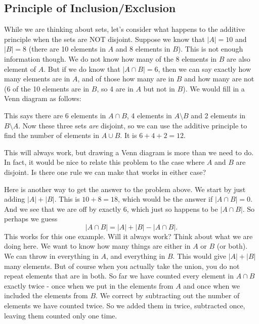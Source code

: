 \documentclass[12pt]{article}
\begin{document}
\subsection{Principle of Inclusion/Exclusion}\label{sec-PIE}

While we are thinking about sets, let's consider what happens to the additive principle when the sets are NOT disjoint. Suppose we know that $|A| = 10$ and $|B| = 8$ (there are 10 elements in $A$ and 8 elements in $B$).  This is not enough information though.  We do not know how many of the 8 elements in $B$ are also element of $A$.  But if we do know that $|A \cap B| = 6$, then we can say exactly how many elements are in $A$, and of those how many are in $B$ and how many are not (6 of the 10 elements are in $B$, so 4 are in $A$ but not in $B$).  We would fill in a Venn diagram as follows:

\begin{center}



\end{center}

This says there are 6 elements in $A \cap B$, 4 elements in $A \setminus B$ and 2 elements in $B \setminus A$.  Now these three sets {\em are} disjoint, so we can use the additive principle to find the number of elements in $A \cup B$.  It is $6 + 4 + 2 = 12$.  

This will always work, but drawing a Venn diagram is more than we need to do.  In fact, it would be nice to relate this problem to the case where $A$ and $B$ are disjoint.  Is there one rule we can make that works in either case?

Here is another way to get the answer to the problem above.  We start by just adding $|A| + |B|$.  This is $10 + 8 = 18$, which would be the answer if $|A \cap B| = 0$.  And we see that we are off by exactly 6, which just so happens to be $|A \cap B|$.  So perhaps we guess
\[|A \cap B| = |A| + |B| - |A \cap B|.\]
This works for this one example.  Will it always work?  Think about what we are doing here.  We want to know how many things are either in $A$ or $B$ (or both).  We can throw in everything in $A$, and everything in $B$.  This would give $|A| + |B|$ many elements.  But of course when you actually take the union, you do not repeat elements that are in both.  So far we have counted every element in $A \cap B$ exactly twice - once when we put in the elements from $A$ and once when we included the elements from $B$.  We correct by subtracting out the number of elements we have counted twice.  So we added them in twice, subtracted once, leaving them counted only one time.
\end{document}
